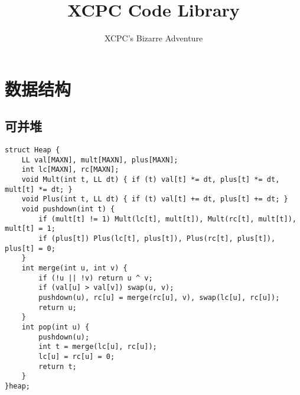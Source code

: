 \documentclass[twocolumn,a4]{article}
\title{\CJKfamily{hei} \bfseries XCPC Code Library}
\author{XCPC's Bizarre Adventure}
\begin{document}
\small
\maketitle

\pagestyle{empty}
\renewcommand{\contentsname}{目录}
\tableofcontents
\pagestyle{fancy}
\setcounter{page}{1}   %

\section{数据结构}
\subsection{可并堆}
\begin{lstlisting}
struct Heap {
	LL val[MAXN], mult[MAXN], plus[MAXN];
	int lc[MAXN], rc[MAXN];
	void Mult(int t, LL dt) { if (t) val[t] *= dt, plus[t] *= dt, mult[t] *= dt; }
	void Plus(int t, LL dt) { if (t) val[t] += dt, plus[t] += dt; }
	void pushdown(int t) {
		if (mult[t] != 1) Mult(lc[t], mult[t]), Mult(rc[t], mult[t]), mult[t] = 1;
		if (plus[t]) Plus(lc[t], plus[t]), Plus(rc[t], plus[t]), plus[t] = 0;
	}
	int merge(int u, int v) {
		if (!u || !v) return u ^ v;
		if (val[u] > val[v]) swap(u, v);
		pushdown(u), rc[u] = merge(rc[u], v), swap(lc[u], rc[u]);
		return u;
	}
	int pop(int u) {
		pushdown(u);
		int t = merge(lc[u], rc[u]);
		lc[u] = rc[u] = 0;
		return t;
	}
}heap;
\end{lstlisting}
\end{document}
